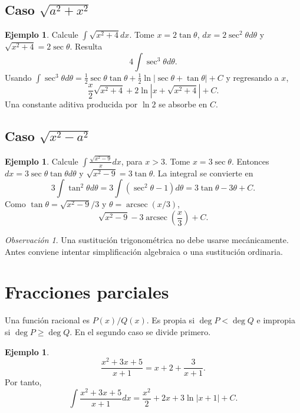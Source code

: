 \documentclass[12pt]{article}
\theoremstyle{definition}
\newtheorem{ejemplo}[teorema]{Ejemplo}
\theoremstyle{remark}
\newtheorem*{observacion}{Observación}
\begin{document}
\subsection*{Caso $\sqrt{a^2+x^2}$}
\begin{ejemplo}Calcule $\int\sqrt{x^2+4}dx$. Tome $x=2\tan\theta$, $dx=2\sec^2\theta d\theta$ y $\sqrt{x^2+4}=2\sec\theta$. Resulta
\[4\int\sec^3\theta d\theta.\]
Usando $\int\sec^3\theta d\theta=\frac12\sec\theta\tan\theta+\frac12\ln|\sec\theta+\tan\theta|+C$ y regresando a $x$,
\[\boxed{\frac{x}{2}\sqrt{x^2+4}+2\ln|x+\sqrt{x^2+4}|+C}.\]
Una constante aditiva producida por $\ln2$ se absorbe en $C$.\end{ejemplo}

\subsection*{Caso $\sqrt{x^2-a^2}$}
\begin{ejemplo}Calcule $\int\frac{\sqrt{x^2-9}}{x}dx$, para $x>3$. Tome $x=3\sec\theta$. Entonces $dx=3\sec\theta\tan\theta d\theta$ y $\sqrt{x^2-9}=3\tan\theta$. La integral se convierte en
\[3\int\tan^2\theta d\theta=3\int(\sec^2\theta-1)d\theta=3\tan\theta-3\theta+C.\]
Como $\tan\theta=\sqrt{x^2-9}/3$ y $\theta=\operatorname{arcsec}(x/3)$,
\[\boxed{\sqrt{x^2-9}-3\operatorname{arcsec}\left(\frac{x}{3}\right)+C}.\]\end{ejemplo}

\begin{observacion}Una sustitución trigonométrica no debe usarse mecánicamente. Antes conviene intentar simplificación algebraica o una sustitución ordinaria.\end{observacion}

\section{Fracciones parciales}
Una función racional es $P(x)/Q(x)$. Es propia si $\deg P<\deg Q$ e impropia si $\deg P\ge\deg Q$. En el segundo caso se divide primero.
\begin{ejemplo}
\[\frac{x^2+3x+5}{x+1}=x+2+\frac3{x+1}.\]
Por tanto,
\[\boxed{\int\frac{x^2+3x+5}{x+1}dx=\frac{x^2}{2}+2x+3\ln|x+1|+C}.\]
\end{ejemplo}
\end{document}
